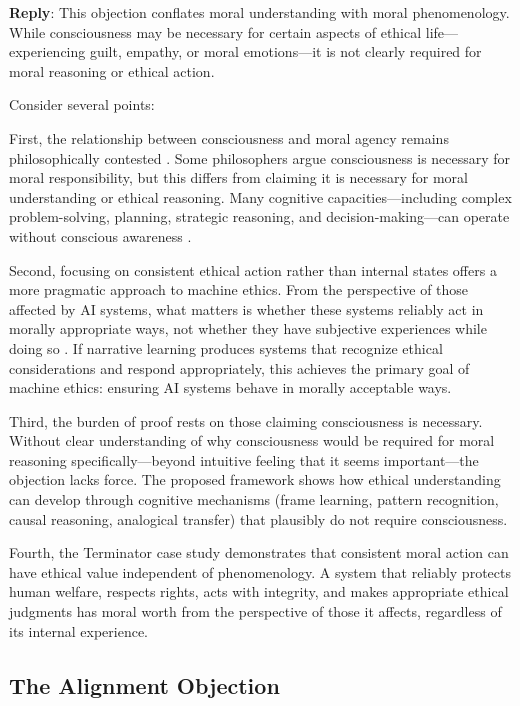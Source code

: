 \documentclass[12pt]{article}
\begin{document}
\textbf{Reply}: This objection conflates moral understanding with moral phenomenology. While consciousness may be necessary for certain aspects of ethical life---experiencing guilt, empathy, or moral emotions---it is not clearly required for moral reasoning or ethical action.

Consider several points:

First, the relationship between consciousness and moral agency remains philosophically contested \citep{levy2014consciousness, shepherd2018consciousness}. Some philosophers argue consciousness is necessary for moral responsibility, but this differs from claiming it is necessary for moral understanding or ethical reasoning. Many cognitive capacities---including complex problem-solving, planning, strategic reasoning, and decision-making---can operate without conscious awareness \citep{carruthers2015conscious}.

Second, focusing on consistent ethical action rather than internal states offers a more pragmatic approach to machine ethics. From the perspective of those affected by AI systems, what matters is whether these systems reliably act in morally appropriate ways, not whether they have subjective experiences while doing so \citep{bryson2018patiency}. If narrative learning produces systems that recognize ethical considerations and respond appropriately, this achieves the primary goal of machine ethics: ensuring AI systems behave in morally acceptable ways.

Third, the burden of proof rests on those claiming consciousness is necessary. Without clear understanding of why consciousness would be required for moral reasoning specifically---beyond intuitive feeling that it seems important---the objection lacks force. The proposed framework shows how ethical understanding can develop through cognitive mechanisms (frame learning, pattern recognition, causal reasoning, analogical transfer) that plausibly do not require consciousness.

Fourth, the Terminator case study demonstrates that consistent moral action can have ethical value independent of phenomenology. A system that reliably protects human welfare, respects rights, acts with integrity, and makes appropriate ethical judgments has moral worth from the perspective of those it affects, regardless of its internal experience.

\subsection{The Alignment Objection}
\end{document}
